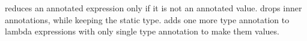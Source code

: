 
reduces an annotated expression only if it is not an annotated value.
 drops inner
annotations, while keeping the static type.
 adds one more type annotation to
lambda expressions with only single type annotation to make them values.

\begin{comment}
\Rref{step-beta} deals with a special case, that occurs when the
argument of a function is a non-annotated lambda expression.
With bi-directional type-checking an expression such as:
($[[\f.f 1:(Int -> Int -> Int) : (Int -> Int -> Int)]]$)($[[\x.x]]$)
\bruno{example here.} \baber{Done.}
is well-typed, since bi-directional type-checking propagates
type information to the arguments. Thus, the dynamic semantics
needs to deal with such programs.
We emphasize the fact that $[[\x.e]]$ is not a value in \cal.
The rule follows the same approach as
\rref{step-beta} except that both of the input types are kept with
$[[\x.e]]$ during substitution i.e $[[\x.e:A2:A1]]$. \Rref{step-ann}
reduces an annotated expression only if it is not a value and $[[e]]$
reduces to some $[[e']]$. \Rref{step-rmann} drops inner
annotations. \Rref{step-lamann} adds one more type annotation with
lambda expressions having single type annotation to make them values.
\end{comment}

